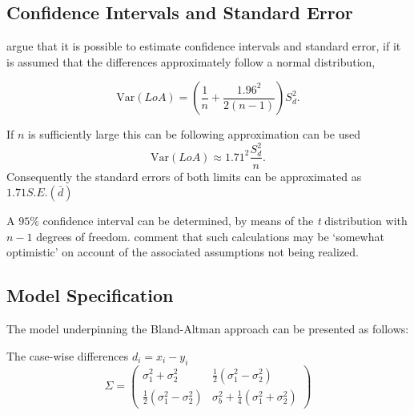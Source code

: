 \documentclass[12pt, a4paper]{report}
\theoremstyle{plain}
\theoremstyle{definition}
\theoremstyle{remark}
\begin{document}
\subsection{Confidence Intervals and Standard Error}
\citet*{BA99} argue that it is possible to estimate confidence
intervals and standard error, if it is assumed that the
differences approximately follow a normal distribution,

\begin{equation}
\mbox{Var}(LoA) = (\frac{1}{n}+\frac{1.96^{2}}{2(n-1)})S_{d}^{2}.
\end{equation}

If $n$ is sufficiently large this can be following approximation
can be used
\begin{equation}
\mbox{Var}(LoA) \approx 1.71^{2}\frac{S_{d}^{2}}{n}.
\end{equation}
Consequently the standard errors of both limits can be
approximated as $1.71 S.E.(\bar{d})$

A $95\%$ confidence interval can be determined, by means of the
\emph{t} distribution with $n-1$ degrees of freedom. \citet*{BA99} comment that such calculations  may be `somewhat
optimistic' on account of the associated assumptions not being
realized.

%	
%	



\subsection{Model Specification}
The model underpinning the Bland-Altman approach can be presented as follows:



The case-wise differences $d_i = x_i - y_i$
\[
\Sigma = \left( \begin{array}{cc}
\sigma^2_1 + \sigma^2_2 &  \frac{1}{2}(\sigma^2_1 - \sigma^2_2) \\
\frac{1}{2}(\sigma^2_1 - \sigma^2_2) &   \sigma^2_b + \frac{1}{4}(\sigma^2_1 + \sigma^2_2)
\end{array}\right)
\]
\end{document}
